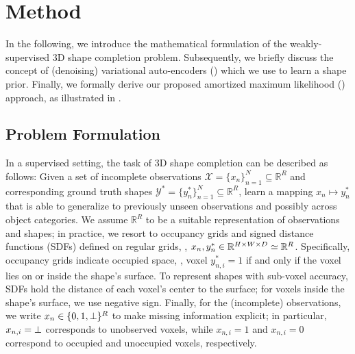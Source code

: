 \section{Method}
\label{sec:method}

In the following, we introduce the mathematical formulation of the weakly-supervised 3D shape completion problem. Subsequently, we briefly discuss the concept of (denoising) variational auto-encoders (\DVAEs) \citep{Kingma2014ICLR,Im2017AAAI} which we use to learn a shape prior. Finally, we formally derive our proposed amortized maximum likelihood (\AML) approach, as illustrated in .

\subsection{Problem Formulation}



In a supervised setting, the task of 3D shape completion can be described as follows: Given a set of incomplete observations $\mathcal{X} = \{x_n\}_{n = 1}^N \subseteq \mathbb{R}^R$ and corresponding ground truth shapes $\mathcal{Y}^* = \{y_n^*\}_{n = 1}^N \subseteq \mathbb{R}^R$, learn a mapping $x_n \mapsto y_n^*$ that is able to generalize to previously unseen observations and possibly across object categories. We assume $\mathbb{R}^R$ to be a suitable representation of observations and shapes; in practice, we resort to occupancy grids and signed distance functions (SDFs) defined on regular grids, \ie, $x_n, y_n^* \in \mathbb{R}^{H \operatorname*{\!\times\!} W \operatorname*{\!\times\!} D} \simeq \mathbb{R}^R$. Specifically, occupancy grids indicate occupied space, \ie, voxel $y_{n,i}^* = 1$ if and only if the voxel lies on or inside the shape's surface. To represent shapes with sub-voxel accuracy, SDFs hold the distance of each voxel's center to the surface; for voxels inside the shape's surface, we use negative sign.
Finally, for the (incomplete) observations, we write $x_n \in \{0, 1, \bot\}^R$ to make missing information explicit; in particular, $x_{n,i} = \bot$ corresponds to unobserved voxels, while $x_{n,i} = 1$ and $x_{n,i} = 0$ correspond to occupied and unoccupied voxels, respectively.

